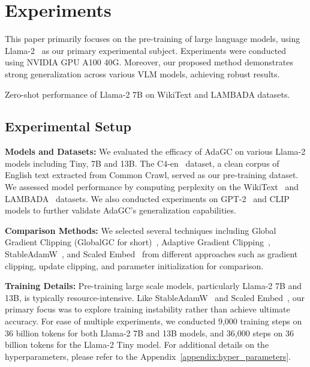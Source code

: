 \section{Experiments}

This paper primarily focuses on the pre-training of large language models, using Llama-2~\cite{touvron2023llama} as our primary experimental subject. Experiments were conducted using NVIDIA GPU A100 40G. Moreover, our proposed method demonstrates strong generalization across various VLM models, achieving robust results.

\begin{table*}[h!]
  \centering
  \caption{Zero-shot performance of Llama-2 7B on WikiText and LAMBADA datasets.}
  \label{tab:llama_7b_zero_shot}
  \vskip 0.1in
  \resizebox{1.0\linewidth}{!}{}
  \vskip -0.2in
\end{table*}

\subsection{Experimental Setup}
\textbf{Models and Datasets:} We evaluated the efficacy of AdaGC on various Llama-2 models including Tiny, 7B and 13B. The C4-en~\cite{raffel2020exploring} dataset, a clean corpus of English text extracted from Common Crawl, served as our pre-training dataset. We assessed model performance by computing perplexity on the WikiText~\cite{merity2016pointer} and LAMBADA~\cite{paperno2016lambada} datasets. We also conducted experiments on GPT-2~\cite{radford2019language} and CLIP~\cite{radford2021learning} models to further validate AdaGC's generalization capabilities.

\textbf{Comparison Methods:} We selected several techniques including Global Gradient Clipping (GlobalGC for short)~\cite{pascanu2013difficulty}, Adaptive Gradient Clipping~\cite{brock2021high}, StableAdamW~\cite{wortsman2023stable}, and Scaled Embed~\cite{takase2023spike} from different approaches such as gradient clipping, update clipping, and parameter initialization for comparison.

\textbf{Training Details:} Pre-training large scale models, particularly Llama-2 7B and 13B, is typically resource-intensive. Like StableAdamW~\cite{wortsman2023stable} and Scaled Embed~\cite{takase2023spike}, our primary focus was to explore training instability rather than achieve ultimate accuracy. For ease of multiple experiments, we conducted 9,000 training steps on 36 billion tokens for both Llama-2 7B and 13B models, and 36,000 steps on 36 billion tokens for the Llama-2 Tiny model. For additional details on the hyperparameters, please refer to the Appendix~\ref{appendix:hyper_parameters}.

